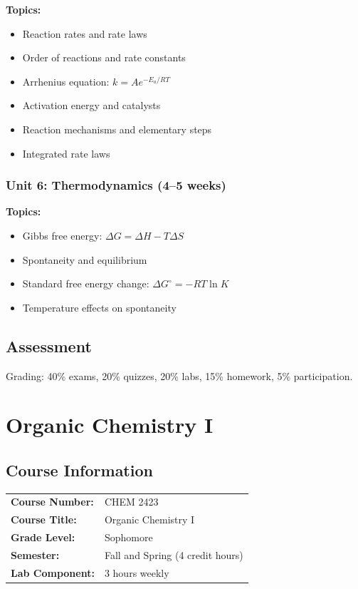\documentclass[12pt,oneside]{book}
\begin{document}
\textbf{Topics:}
\begin{itemize}
    \item Reaction rates and rate laws
    \item Order of reactions and rate constants
    \item Arrhenius equation: $k = A e^{-E_a/RT}$
    \item Activation energy and catalysts
    \item Reaction mechanisms and elementary steps
    \item Integrated rate laws
\end{itemize}

\subsection{Unit 6: Thermodynamics (4--5 weeks)}

\textbf{Topics:}
\begin{itemize}
    \item Gibbs free energy: $\Delta G = \Delta H - T\Delta S$
    \item Spontaneity and equilibrium
    \item Standard free energy change: $\Delta G^\circ = -RT\ln K$
    \item Temperature effects on spontaneity
\end{itemize}

\section{Assessment}

Grading: 40\% exams, 20\% quizzes, 20\% labs, 15\% homework, 5\% participation.


\chapter{Organic Chemistry I}

\section{Course Information}

\begin{tabular}{ll}
\textbf{Course Number:} & CHEM 2423 \\
\textbf{Course Title:} & Organic Chemistry I \\
\textbf{Grade Level:} & Sophomore \\
\textbf{Semester:} & Fall and Spring (4 credit hours) \\
\textbf{Lab Component:} & 3 hours weekly \\
\end{tabular}
\end{document}
